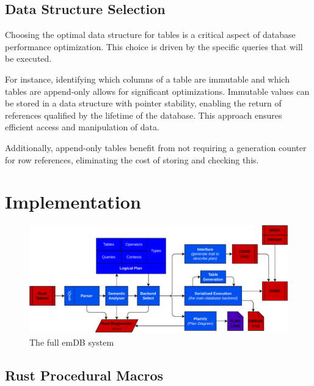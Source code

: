 \documentclass[conference]{IEEEtran}
\begin{document}
\subsection{Data Structure Selection}
%

Choosing the optimal data structure for tables is a critical aspect of database performance optimization.
This choice is driven by the specific queries that will be executed.

For instance, identifying which columns of a table are immutable and which tables are append-only
allows for significant optimizations. Immutable values can be stored in a data structure with pointer
stability, enabling the return of references qualified by the lifetime of the database. This approach
ensures efficient access and manipulation of data.

Additionally, append-only tables benefit from not requiring a generation counter for row references, 
eliminating the cost of storing and checking this.

\section{Implementation}

\begin{figure}[b]
    \centering
    \includegraphics[width=\textwidth]{_diagrams/system.pdf}
    \caption{The full emDB system}
    \label{fig:emdb-system}
\end{figure}

\subsection{Rust Procedural Macros}
\end{document}
